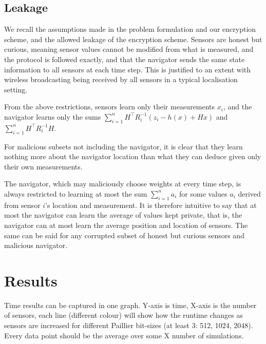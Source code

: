 \documentclass[twocolumn]{autart}
\begin{document}
\subsection{Leakage} \label{subsec:leakage}
We recall the assumptions made in the problem formulation and our encryption scheme, and the allowed leakage of the encryption scheme. Sensors are honest but curious, meaning sensor values cannot be modified from what is measured, and the protocol is followed exactly, and that the navigator sends the same state information to all sensors at each time step. This is justified to an extent with wireless broadcasting being received by all sensors in a typical localisation setting.

From the above restrictions, sensors learn only their measurements $x_i$, and the navigator learns only the sums $\sum^n_{i=1}H^\top R^{-1}_i(z_i - h(x) + Hx)$ and $\sum^n_{i=1}H^\top R_i^{-1}H$.

For malicious subsets not including the navigator, it is clear that they learn nothing more about the navigator location than what they can deduce given only their own measurements.

The navigator, which may maliciously choose weights at every time step, is always restricted to learning at most the sum $\sum^n_{i=1} a_i$ for some values $a_i$ derived from sensor $i$'s location and measurement. It is therefore intuitive to say that at most the navigator can learn the average of values kept private, that is, the navigator can at most learn the average position and location of sensors. The same can be said for any corrupted subset of honest but curious sensors and malicious navigator.


% 
%                                                          
%                                                          
%                                                          
% 

\section{Results} \label{sec:results}
Time results can be captured in one graph. Y-axis is time, X-axis is the number of sensors, each line (different colour) will show how the runtime changes as sensors are increased for different Paillier bit-sizes (at least 3: 512, 1024, 2048). Every data point should be the average over some X number of simulations.
\end{document}
